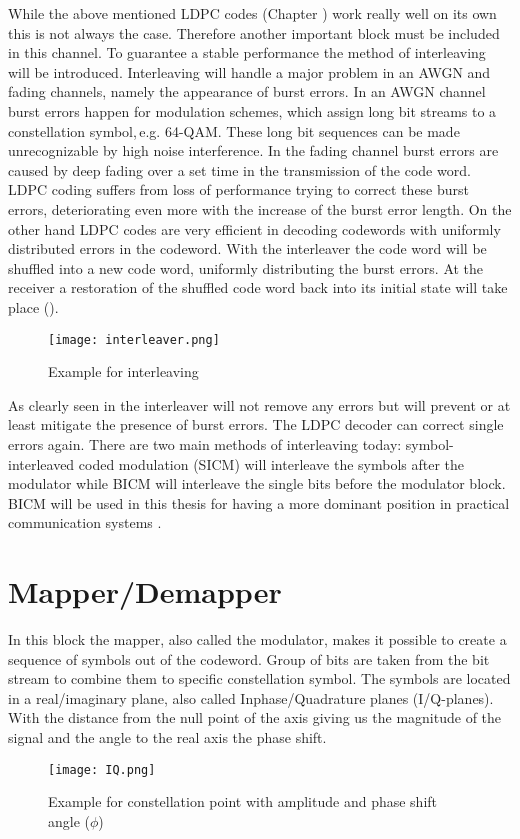 While the above mentioned \gls{LDPC} codes (Chapter ) work really well on its own this is not always the case. Therefore another important block must be included in this channel. To guarantee a stable performance the method of interleaving will be introduced. Interleaving will handle a major problem in an AWGN and fading channels, namely the appearance of burst errors. In an \gls{AWGN} channel burst errors happen for modulation schemes, which assign long bit streams to a constellation symbol,\,e.g. 64-QAM. These long bit sequences can be made unrecognizable by high noise interference. In the fading channel burst errors are caused by deep fading over a set time in the transmission of the code word. \gls{LDPC} coding suffers from loss of performance trying to correct these burst errors, deteriorating even more with the increase of the burst error length. On the other hand \gls{LDPC} codes are very efficient in decoding codewords with uniformly distributed errors in the codeword. With the interleaver the code word will be shuffled into a new code word, uniformly distributing the burst errors. At the receiver a restoration of the shuffled code word back into its initial state will take place ().
\begin{figure}[!htb]
	\centering
	\texttt{[image: interleaver.png]}
	\caption{Example for interleaving}
	\label{fig:interleaver}
\end{figure}

As clearly seen in  the interleaver will not remove any errors but will prevent or at least mitigate the presence of burst errors. The \gls{LDPC} decoder can correct single errors again. There are two main methods of interleaving today: symbol-interleaved coded modulation (SICM) will interleave the symbols after the modulator while \gls{BICM} will interleave the single bits before the modulator block. \gls{BICM} will be used in this thesis for having a more dominant position in practical communication systems \cite{Fabregas03}.

\clearpage

\section{Mapper/Demapper}
\label{sec:mapper}

In this block the mapper, also called the modulator, makes it possible to create a sequence of symbols out of the codeword. Group of bits are taken from the bit stream to combine them to specific constellation symbol. The symbols are located in a real/imaginary plane, also called Inphase/Quadrature planes (I/Q-planes). With the distance from the null point of the axis giving us the magnitude of the signal and the angle to the real axis the phase shift. 
\begin{figure}[!htb]
	\centering
	\texttt{[image: IQ.png]}
	\caption{Example for constellation point with amplitude and phase shift angle ($\phi$)}
	\label{fig:IQ}
\end{figure}

